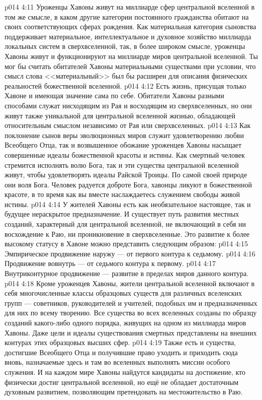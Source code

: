 \vs p014 4:11 Уроженцы Хавоны живут на миллиарде сфер центральной вселенной в том же смысле, в каком другие категории постоянного гражданства обитают на своих соответствующих сферах рождения. Как материальная категория сыновства поддерживает материальное, интеллектуальное и духовное хозяйство миллиарда локальных систем в сверхвселенной, так, в более широком смысле, уроженцы Хавоны живут и функционируют на миллиарде миров центральной вселенной. Ты мог бы считать обитателей Хавоны материальными существами при условии, что смысл слова <<материальный>> был бы расширен для описания физических реальностей божественной вселенной.
\vs p014 4:12 Есть жизнь, присущая только Хавоне и имеющая значение сама по себе. Обитатели Хавоны разными способами служат нисходящим из Рая и восходящим из сверхвселенных, но они живут также уникальной для центральной вселенной жизнью, обладающей относительным смыслом независимо от Рая или сверхвселенных.
\vs p014 4:13 Как поклонение сынов веры эволюционных миров служит удовлетворению любви Всеобщего Отца, так и возвышенное обожание уроженцев Хавоны насыщает совершенные идеалы божественной красоты и истины. Как смертный человек стремится исполнять волю Бога, так и эти существа центральной вселенной живут, чтобы удовлетворять идеалы Райской Троицы. По самой своей природе они  воля Бога. Человек радуется доброте Бога, хавонцы ликуют в божественной красоте, в то время как вы вместе наслаждаетесь служением свободы живой истины.
\vs p014 4:14 У жителей Хавоны есть как необязательное настоящее, так и будущее нераскрытое предназначение. И существует путь развития местных созданий, характерный для центральной вселенной, не включающий в себя ни восхождение к Раю, ни проникновение в сверхвселенные. Это развитие к более высокому статусу в Хавоне можно представить следующим образом:
\vs p014 4:15 Эмпирическое продвижение наружу --- от первого контура к седьмому.
\vs p014 4:16 Продвижение вовнутрь --- от седьмого контура к первому.
\vs p014 4:17 Внутриконтурное продвижение --- развитие в пределах миров данного контура.
\vs p014 4:18 \pc Кроме уроженцев Хавоны, жители центральной вселенной включают в себя многочисленные классы образцовых существ для различных вселенских групп --- советников, руководителей и учителей, подобных им и предназначенных для них по всему творению. Все существа во всех вселенных созданы по образцу созданий какого\hyp{}либо одного порядка, живущих на одном из миллиарда миров Хавоны. Даже цели и идеалы существования смертных представлены на внешних контурах этих образцовых высших сфер.
\vs p014 4:19 Также есть и существа, достигшие Всеобщего Отца и получившие право уходить и приходить сюда вновь, назначаемые здесь и там во вселенных выполнять миссии особого служения. И на каждом мире Хавоны найдутся кандидаты на достижение, кто физически достиг центральной вселенной, но ещё не обладает достаточным духовным развитием, позволяющим претендовать на местожительство в Раю.
